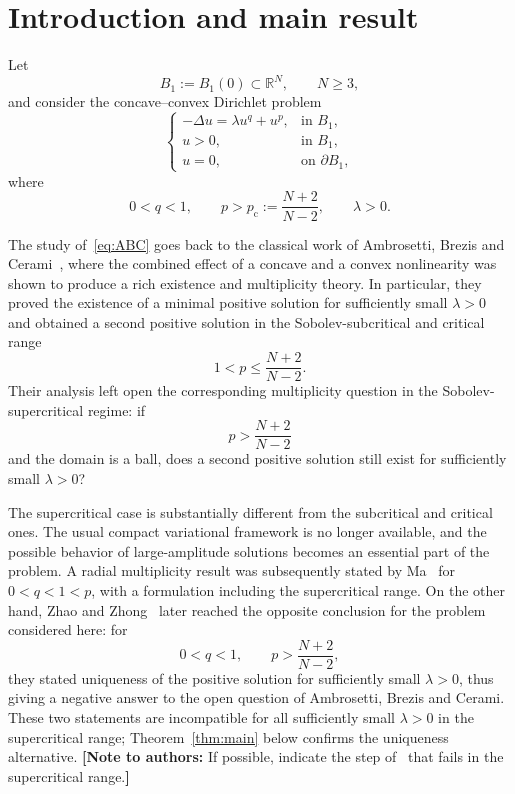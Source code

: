 \documentclass[11pt]{article}
\newcommand{\pc}{p_{\mathrm c}}
\newcommand{\add}[1]{{\color{blue}#1}}
\newcommand{\nota}[1]{{\color{green!50!black}\textbf{[Note to authors:} #1\textbf{]}}}
\theoremstyle{definition}
\begin{document}
\section{Introduction and main result}
Let
\[
B_1:=B_1(0)\subset\mathbb{R}^N,
\qquad N\geq3,
\]
and consider the concave--convex Dirichlet problem
\begin{equation}
\label{eq:ABC}
\begin{cases}
-\Delta u=\lambda u^q+u^p,
&\text{in }B_1,\\
u>0,
&\text{in }B_1,\\
u=0,
&\text{on }\partial B_1,
\end{cases}
\end{equation}
where
\begin{equation}
\label{eq:hyp}
0<q<1,
\qquad
p>\pc:=\frac{N+2}{N-2},
\qquad
\lambda>0.
\end{equation}

The study of~\eqref{eq:ABC} goes back to the classical work of
Ambrosetti, Brezis and Cerami~\cite{ABC}, where the combined effect
of a concave and a convex nonlinearity was shown to produce a rich
existence and multiplicity theory. In particular, they proved the
existence of a minimal positive solution for sufficiently small
$\lambda>0$ and obtained a second positive solution in the
Sobolev-subcritical and critical range
\[
1<p\leq \frac{N+2}{N-2}.
\]
Their analysis left open the corresponding multiplicity question in
the Sobolev-supercritical regime: if
\[
p>\frac{N+2}{N-2}
\]
and the domain is a ball, does a second positive solution still exist
for sufficiently small $\lambda>0$?

The supercritical case is substantially different from the
subcritical and critical ones. The usual compact variational
framework is no longer available, and the possible behavior of
large-amplitude solutions becomes an essential part of the problem.
A radial multiplicity result was subsequently stated by
Ma~\cite{Ma1996} for $0<q<1<p$, with a formulation including the
supercritical range. On the other hand, Zhao and
Zhong~\cite{ZhaoZhong2002} later reached the opposite conclusion for
the problem considered here: for
\[
0<q<1,
\qquad
p>\frac{N+2}{N-2},
\]
they stated uniqueness of the positive solution for sufficiently
small $\lambda>0$, thus giving a negative answer to the open question
of Ambrosetti, Brezis and Cerami.
\add{These two statements are incompatible for all sufficiently small
$\lambda>0$ in the supercritical range; Theorem~\ref{thm:main} below
confirms the uniqueness alternative.}
\nota{If possible, indicate the step of~\cite{Ma1996} that fails in the
supercritical range.}
\end{document}
